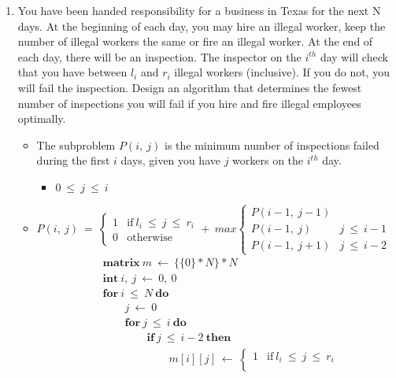 \documentclass[a4paper]{article}
\begin{document}
\begin{enumerate}
				\item You have been handed responsibility for a business in Texas for the next N days. At the beginning of each day, you may hire an illegal worker, keep the number of illegal workers the same or fire an illegal worker. At the end of each day, there will be an inspection. The inspector on the $i^{th}$ day will check that you have between $l_i$ and $r_i$ illegal workers (inclusive). If you do not, you will fail the inspection. Design an algorithm that determines the fewest number of inspections you will fail if you hire and fire illegal employees optimally.
						\begin{itemize}
								\item The subproblem $P(i,\ j)$ is the minimum number of inspections failed during the first $i$ days, given you have $j$ workers on the $i^{th}$ day. 
										\begin{itemize}
												\item $0\ \leq\ j\ \leq\ i$
										\end{itemize}
												\item $P(i,\ j)\ =\ 
														\begin{cases}
																1 & \text{if}\ l_i\ \leq\ j\ \leq\ r_i \\
																0 & \text{otherwise}
														\end{cases} +\ \textit{max} 
														\begin{cases}
																P(i-1,\ j-1) & \\
																P(i-1,\ j) & j\ \leq\ i-1 \\
																P(i-1,\ j+1) & j\ \leq\ i-2
														\end{cases}$
														\begin{align*}
																&\textbf{matrix}\ m\ \gets\ \{\{0\}*N\}*N \\
																&\textbf{int}\ i,\ j\ \gets\ 0,\ 0 \\
																&\textbf{for}\ i\ \leq\ N\ \textbf{do} \\
																&\qquad j\ \gets\ 0 \\
																&\qquad\textbf{for}\ j\ \leq\ i\ \textbf{do} \\
																&\qquad\qquad\textbf{if}\ j\ \leq\ i-2\ \textbf{then} \\
																&\qquad\qquad\qquad m[i][j]\ \gets\ 
																\begin{cases}
																		1 & \text{if}\ l_i\ \leq\ j\ \leq\ r_i \\

\end{cases}
\end{align*}
\end{itemize}
\end{enumerate}
\end{document}
